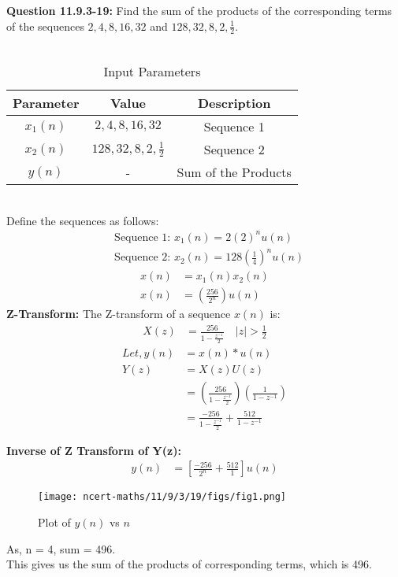 \documentclass[journal,12pt,twocolumn]{IEEEtran}
\theoremstyle{remark}
\begin{document}
\title{}
\author{Sasa Mardi, EE23BTECH11222}
\date{}
\maketitle
\textbf{Question 11.9.3-19:} Find the sum of the products of the corresponding terms of the sequences $2, 4, 8, 16, 32$ and $128, 32, 8, 2, \frac{1}{2}$.\\
\\
\solution
\fi
\begin{table}[h!]
    \centering
    \caption{Input Parameters}
    \label{tab.11.9.3.19:1}
    \begin{tabular}{ | c | c | c | }
        \hline
        Parameter & Value & Description \\
        \hline
        $x_1(n)$ & $2, 4, 8, 16, 32$ &  Sequence 1 \\
        \hline
        $x_2(n)$ & $128, 32, 8, 2, \frac{1}{2}$ &  Sequence 2 \\
        \hline
        $y(n)$ & - &  Sum of the Products \\
        \hline
    \end{tabular}
\end{table}\\
Define the sequences as follows:\\
\begin{align}
&\text{Sequence 1: } x_1(n) = 2(2)^nu(n) \\
&\text{Sequence 2: } x_2(n) = 128\left(\frac{1}{4}\right)^nu(n)
\end{align}
\begin{align}
x(n) &= x_1(n)x_2(n) \\
x(n) &= \left(\frac{256}{2^{n}}\right)u(n)
\end{align}
\textbf{Z-Transform:}
The Z-transform of a sequence \( x(n) \) is:
\begin{align}
X(z) &= \frac{256}{1 - \frac{z^{-1}}{2}}    \quad |z| > \frac{1}{2}
\end{align}
\begin{align}
Let, y(n) &= x(n)*u(n) \\
 Y(z) &= X(z)U(z) \\
 &= \left(\frac{256}{1 - \frac{z^{-1}}{2}}\right)\left(\frac{1}{1 - z^{-1}}\right)\\
 &= \frac{-256}{1 - \frac{z^{-1}}{2}} + \frac{512}{1 - z^{-1}}
\end{align}

\textbf{Inverse of Z Transform of Y(z):} \\
\begin{align}
y(n) &= \left[\frac{-256}{2^{n}} + \frac{512}{1}\right]u(n)
\end{align}
\begin{figure}[h!]
    \centering
    \texttt{[image: ncert-maths/11/9/3/19/figs/fig1.png]}
    \caption{Plot of $y(n)$ vs $n$}
    \label{fig.11.9.3.19:2}
\end{figure}
As, n = 4, sum = 496. \\
This gives us the sum of the products of corresponding terms, which is 496.
\end{document}

